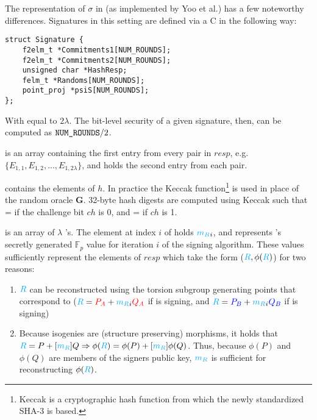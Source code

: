 \vspace{10px}
\noindent
The representation of $\sigma$ in \sidh (as implemented by Yoo et al.) has a few noteworthy differences. Signatures in this setting are defined via a C  in the following way:\\

\begin{lstlisting}
struct Signature {
	f2elm_t *Commitments1[NUM_ROUNDS];
	f2elm_t *Commitments2[NUM_ROUNDS];
	unsigned char *HashResp;
	felm_t *Randoms[NUM_ROUNDS];
	point_proj *psiS[NUM_ROUNDS];
};
\end{lstlisting}
\vspace{15px}

With  equal to $2\lambda$. The bit-level security of a given signature, then, can be computed as $\texttt{NUM\_ROUNDS}/2$.

 is an array containing the first entry from every pair in $resp$, e.g.\ $\{E_{1,1}, E_{1,2}, ..., E_{1,2\lambda}\}$, and  holds the second entry from each pair. 

 contains the elements of $h$. In practice the Keccak function\footnote{Keccak is a cryptographic hash function from which the newly standardized SHA-3 is based.} is used in place of the random oracle \textbf{G}. 32-byte hash digests are computed using Keccak such that  =  if the challenge bit $ch$ is 0, and  =  if $ch$ is 1.

 is an array of $\lambda$ 's. The element at index $i$ of  holds $\textcolor{cyan}{m_R}_{i}$, and represents \randall's secretly generated $\mathbb{F}_{p}$ value for iteration $i$ of the signing algorithm. These values sufficiently represent the elements of $resp$ which take the form ($\textcolor{cyan}{R}, \phi(\textcolor{cyan}{R})$) for two reasons: 
\begin{enumerate}
\item $\textcolor{cyan}{R}$ can be reconstructed using the torsion subgroup generating points that correspond to \randall ($\textcolor{cyan}{R} = \textcolor{red}{P_A} + \textcolor{cyan}{m_R}_{i}\textcolor{red}{Q_A}$ if \bob is signing, and $\textcolor{cyan}{R} = \textcolor{blue}{P_B} + \textcolor{cyan}{m_R}_{i}\textcolor{blue}{Q_B}$ if \alice is signing)
\item Because isogenies are (structure preserving) morphisms, it holds that $\textcolor{cyan}{R} = P + [\textcolor{cyan}{m_R}]Q \Rightarrow \phi(\textcolor{cyan}{R}) = \phi(P) + [\textcolor{cyan}{m_R}]\phi(Q)$. Thus, because $\phi(P)$ and $\phi(Q)$ are members of the signers public key, $\textcolor{cyan}{m_R}$ is sufficient for reconstructing $\phi(\textcolor{cyan}{R})$.
\end{enumerate}

